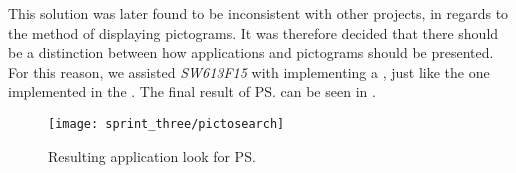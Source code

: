 \FloatBarrier
This solution was later found to be inconsistent with other projects, in regards to the method of displaying pictograms. It was therefore decided that there should be a distinction between how applications and pictograms should be presented. For this reason, we assisted \emph{SW613F15} with implementing a , just like the one implemented in the \ct. The final result of \ps can be seen in .

\begin{figure}[!htbp]
    \centering
    \texttt{[image: sprint\_three/pictosearch]}
    \caption{Resulting application look for \ps}
    \label{fig:pictosearch}
\end{figure}